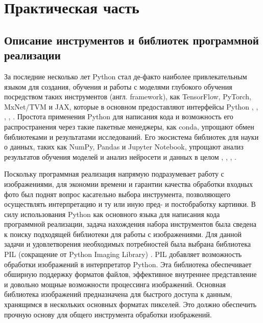 \documentclass[bachelor, och, coursework]{SCWorks}
\begin{document}
\section{Практическая часть}

    \subsection{Описание инструментов и библиотек программной реализации}

        За последние несколько лет Python стал де-факто наиболее привлекательным
        языком для создания, обучения и работы с моделями глубокого обучения
        посредством таких инструментов (англ. framework), как TensorFlow,
        PyTorch, MxNet/TVM и JAX, которые в основном предоставляют интерфейсы
        Python \cite{fwtf}, \cite{fwpytorch}, \cite{fwmxnet}, \cite{fwtvm},
        \cite{fwjax}. Простота применения Python для написания кода и
        возможность его распространения через такие пакетные менеджеры, как
        conda, упрощают обмен библиотеками и результатами исследований. Его
        экосистема библиотек для науки о данных, таких как NumPy, Pandas и
        Jupyter Notebook, упрощают анализ результатов обучения моделей и анализ
        нейросети и данных в целом \cite{python}, \cite{fwnumpy},
        \cite{fwpandas}, \cite{fwjupyter}.

        Поскольку программная реализация напрямую подразумевает работу с
        изображениями, для экономии времени и гарантии качества обработки
        входных фото был поднят вопрос касательно выбора инструмента,
        позволяющего осуществлять интерпретацию и ту или иную пред- и
        постобработку картинки. В силу использования Python как основного языка
        для написания кода программной реализации, задача нахождения набора
        инструментов была сведена к поиску подходящей библиотеки для работы с
        изображениями. Для данной задачи и удовлетворения необходимых
        потребностей была выбрана библиотека PIL (сокращение от Python Imaging
        Library) \cite{pil}. PIL добавляет возможность обработки изображений в
        интерпретатор Python. Эта библиотека обеспечивает обширную поддержку
        форматов файлов, эффективное внутреннее представление и довольно мощные
        возможности процессинга изображений. Основная библиотека изображений
        предназначена для быстрого доступа к данным, хранящимся в нескольких
        основных форматах пикселей. Это должно обеспечить прочную основу для
        общего инструмента обработки изображений.
\end{document}
